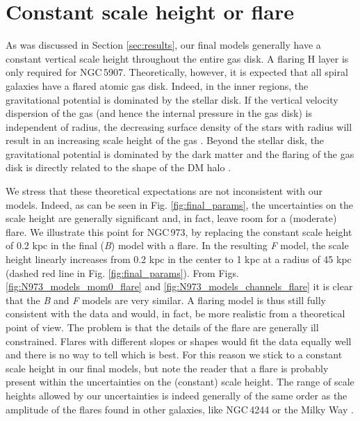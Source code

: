 \documentclass{aa}
\begin{document}
\section{Constant scale height or flare}
\label{sec:flare}

As was discussed in Section \ref{sec:results}, our final models generally have a constant vertical scale height throughout the entire gas disk. A flaring H{} layer is only required for NGC\,5907. Theoretically, however, it is expected that all spiral galaxies have a flared atomic gas disk. Indeed, in the inner regions, the gravitational potential is dominated by the stellar disk. If the vertical velocity dispersion of the gas (and hence the internal pressure in the gas disk) is independent of radius, the decreasing surface density of the stars with radius will result in an increasing scale height of the gas \citep[e.g.][]{vanderkruit81}. Beyond the stellar disk, the gravitational potential is dominated by the dark matter and the flaring of the gas disk is directly related to the shape of the DM halo \citep[e.g.][]{olling95,olling96,becquaert97,obrien10a,obrien10b,obrien10c,obrien10d,peters13}.
\par
We stress that these theoretical expectations are not inconsistent with our models. Indeed, as can be seen in Fig. \ref{fig:final_params}, the uncertainties on the scale height are generally significant and, in fact, leave room for a (moderate) flare. We illustrate this point for NGC\,973, by replacing the constant scale height of 0.2 kpc in the final (\textit{B}) model with a flare. In the resulting \textit{F} model, the scale height linearly increases from 0.2 kpc in the center to 1 kpc at a radius of 45 kpc (dashed red line in Fig. \ref{fig:final_params}). From Figs. \ref{fig:N973_models_mom0_flare} and \ref{fig:N973_models_channels_flare} it is clear that the \textit{B} and \textit{F} models are very similar. A flaring model is thus still fully consistent with the data and would, in fact, be more realistic from a theoretical point of view. The problem is that the details of the flare are generally ill constrained. Flares with different slopes or shapes would fit the data equally well and there is no way to tell which is best. For this reason we stick to a constant scale height in our final models, but note the reader that a flare is probably present within the uncertainties on the (constant) scale height. The range of scale heights allowed by our uncertainties is indeed generally of the same order as the amplitude of the flares found in other galaxies, like NGC\,4244 \citep{olling96} or the Milky Way \citep{kalberla08}.
\end{document}
